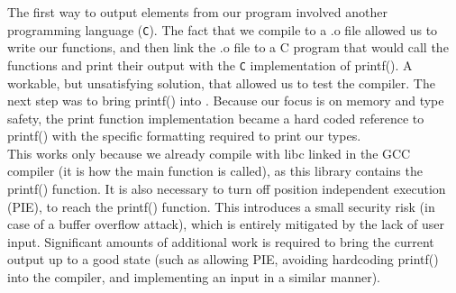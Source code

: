 The first way to output elements from our  program involved another programming
language (\texttt{C}). The fact that we compile to a .o file allowed us to write our
functions, and then link the .o file to a C program that would call the \lang{}
functions and print their output with the \texttt{C} implementation of printf(). A workable, but unsatisfying solution, that allowed us to test the compiler. The next step was to bring printf() into \lang. Because our focus is on memory and type safety, the print function implementation became a hard coded reference to printf() with the specific formatting required to print our types.\\

This works only because we already compile with libc linked in the GCC compiler (it
is how the main function is called), as this library contains the printf() function.
It is also necessary to turn off position independent execution (PIE), to reach the
printf() function. This introduces a small security risk (in case of a buffer
overflow attack), which is entirely mitigated by the lack of user input. Significant
amounts of additional work is required to bring the current output up to a good state
(such as allowing PIE, avoiding hardcoding printf() into the compiler, and implementing an input in a similar manner).

